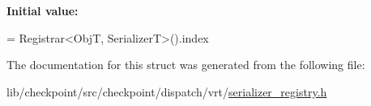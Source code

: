 {\bfseries Initial value\+:}
\begin{DoxyCode}
=
  Registrar<ObjT, SerializerT>().index
\end{DoxyCode}


The documentation for this struct was generated from the following file\+:\begin{DoxyCompactItemize}
\item 
lib/checkpoint/src/checkpoint/dispatch/vrt/\hyperlink{serializer__registry_8h}{serializer\+\_\+registry.\+h}\end{DoxyCompactItemize}
